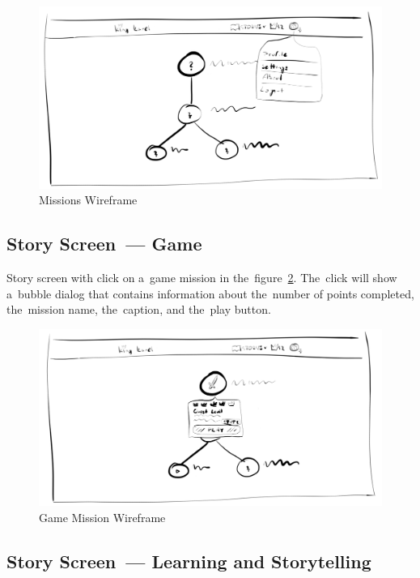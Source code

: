 \begin{figure}
    \centering
    \includegraphics[width=1\linewidth]{assets/design/ui/wir_stories.png}
    \caption{Missions Wireframe}
    \label{fig:design:wir:missions}
\end{figure}

\subsection{Story Screen~--- Game}

Story screen with click on a~game mission in the~figure~\ref{fig:design:wir:story-game}.
The~click will show a~bubble dialog that contains information about the~number of points completed, the~mission name, the~caption, and the~play button.

\begin{figure}
    \centering
    \includegraphics[width=1\linewidth]{assets/design/ui/wir_game.png}
    \caption{Game Mission Wireframe}
    \label{fig:design:wir:story-game}
\end{figure}

\subsection{Story Screen~--- Learning and Storytelling}


